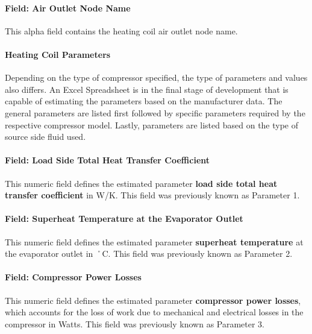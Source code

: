 \paragraph{Field: Air Outlet Node Name}\label{field-air-outlet-node-name-19}

This alpha field contains the heating coil air outlet node name.

\paragraph{Heating Coil Parameters}\label{heating-coil-parameters}

Depending on the type of compressor specified, the type of parameters and values also differs. An Excel Spreadsheet is in the final stage of development that is capable of estimating the parameters based on the manufacturer data. The general parameters are listed first followed by specific parameters required by the respective compressor model. Lastly, parameters are listed based on the type of source side fluid used.

\paragraph{Field: Load Side Total Heat Transfer Coefficient}\label{field-load-side-total-heat-transfer-coefficient-1}

This numeric field defines the estimated parameter \textbf{load side total heat transfer coefficient} in W/K. This field was previously known as Parameter 1.

\paragraph{Field: Superheat Temperature at the Evaporator Outlet}\label{field-superheat-temperature-at-the-evaporator-outlet-1}

This numeric field defines the estimated parameter \textbf{superheat temperature} at the evaporator outlet in ˚C. This field was previously known as Parameter 2.

\paragraph{Field: Compressor Power Losses}\label{field-compressor-power-losses-1}

This numeric field defines the estimated parameter \textbf{compressor power losses}, which accounts for the loss of work due to mechanical and electrical losses in the compressor in Watts. This field was previously known as Parameter 3.

